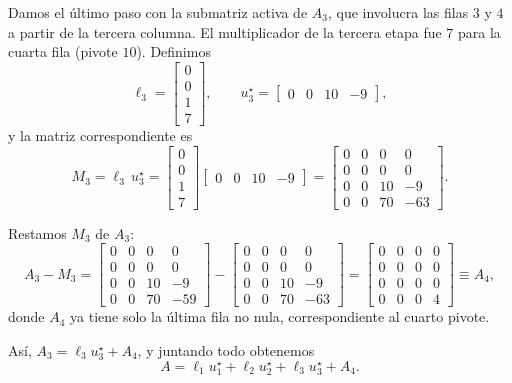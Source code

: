 Damos el último paso con la submatriz activa de $A_3$, que involucra las filas $3$ y $4$ a partir de la tercera columna. El multiplicador de la tercera etapa fue $7$ para la cuarta fila (pivote $10$). Definimos
\[
\ell_3 = \begin{bmatrix} 0 \\ 0 \\ 1 \\ 7 \end{bmatrix}, \qquad
u_3^\star = \begin{bmatrix} 0 & 0 & 10 & -9 \end{bmatrix},
\]
y la matriz correspondiente es
\[
M_3 = \ell_3\, u_3^\star =
\begin{bmatrix} 0 \\ 0 \\ 1 \\ 7 \end{bmatrix}
\begin{bmatrix} 0 & 0 & 10 & -9 \end{bmatrix}
=
\begin{bmatrix}
0 & 0 &  0 &  0 \\
0 & 0 &  0 &  0 \\
0 & 0 & 10 & -9 \\
0 & 0 & 70 & -63
\end{bmatrix}.
\]

Restamos $M_3$ de $A_3$:
\[
A_3 - M_3 =
\begin{bmatrix}
0 & 0 &  0 &  0 \\
0 & 0 &  0 &  0 \\
0 & 0 & 10 & -9 \\
0 & 0 & 70 & -59
\end{bmatrix}
-
\begin{bmatrix}
0 & 0 &  0 &  0 \\
0 & 0 &  0 &  0 \\
0 & 0 & 10 & -9 \\
0 & 0 & 70 & -63
\end{bmatrix}
=
\begin{bmatrix}
0 & 0 &  0 &  0 \\
0 & 0 &  0 &  0 \\
0 & 0 &  0 &  0 \\
0 & 0 &  0 &  4
\end{bmatrix}
\equiv A_4,
\]
donde $A_4$ ya tiene solo la última fila no nula, correspondiente al cuarto pivote.

Así, $A_3 = \ell_3 u_3^\star + A_4$, y juntando todo obtenemos
\[
A = \ell_1 u_1^\star + \ell_2 u_2^\star + \ell_3 u_3^\star + A_4.
\]

